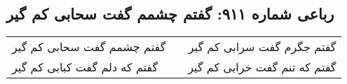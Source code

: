 \begin{center}
\section*{رباعی شماره ۹۱۱: گفتم چشمم گفت سحابی کم گیر}
\label{sec:0911}
\begin{longtable}{l p{0.5cm} r}
گفتم چشمم گفت سحابی کم گیر
&&
گفتم جگرم گفت سرابی کم گیر
\\
گفتم که دلم گفت کبابی کم گیر
&&
گفتم که تنم گفت خرابی کم گیر
\\
\end{longtable}
\end{center}

